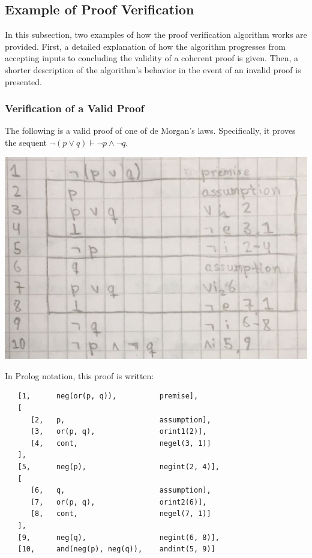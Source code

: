 \documentclass[a4paper, 11pt]{article}
\begin{document}
   \subsection{Example of Proof Verification}

   In this subsection, two examples of how the proof
   verification algorithm works are provided. First, a
   detailed explanation of how the algorithm progresses from
   accepting inputs to concluding the validity of a coherent 
   proof is given. Then, a shorter description of the 
   algorithm's behavior in the event of an invalid proof is 
   presented.
   
   \subsubsection{Verification of a Valid Proof}

   The following is a valid proof of one of de Morgan's laws.
   Specifically, it proves the sequent 
   $\neg(p \vee q) \vdash \neg p \wedge \neg q$.
   \bigbreak

   \includegraphics[scale=0.25]{de-morgan-valid}
   
   In Prolog notation, this proof is written:

\begin{verbatim}
   [1,      neg(or(p, q)),          premise],
   [
      [2,   p,                      assumption],
      [3,   or(p, q),               orint1(2)],
      [4,   cont,                   negel(3, 1)]
   ],
   [5,      neg(p),                 negint(2, 4)],
   [
      [6,   q,                      assumption],
      [7,   or(p, q),               orint2(6)],
      [8,   cont,                   negel(7, 1)]
   ],
   [9,      neg(q),                 negint(6, 8)],
   [10,     and(neg(p), neg(q)),    andint(5, 9)]
\end{verbatim}
\end{document}
